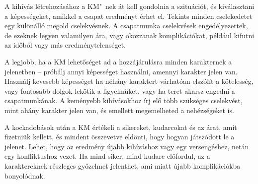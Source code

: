 A kihívás létrehozásához a KM"~nek át kell gondolnia a szituációt, és kiválasztani a képességeket, amikkel a csapat eredményt érhet el. Tekints minden cselekedetet egy különálló megold cselekvésnek. A csapatmunka cselekvések engedélyezettek, de ezeknek legyen valamilyen ára, vagy okozzanak komplikációkat, például kifutni az időből vagy más eredménytelenséget.

A legjobb, ha a KM lehetőséget ad a hozzájárulásra minden karakternek a jelenetben -- próbálj annyi képességet használni, amennyi karakter jelen van. Használj kevesebb képességet ha néhány karaktert várhatóan elszólít a kötelesség, vagy fontosabb dolgok lekötik a figyelmüket, vagy ha teret akarsz engedni a csapatmunkának. A keményebb kihívásokhoz írj elő több szükséges cselekvést, mint ahány karakter jelen van, és emellett megemelheted a nehézségeket is.

A kockadobások után a KM értékeli a sikereket, kudarcokat és az árat, amit fizetniük kellett, és mindent összevetve eldönti, hogy hogyan játszódott le a jelenet. Lehet, hogy az eredmény újabb kihíváshoz vagy egy versengéshez, netán egy konfliktushoz vezet. Ha mind siker, mind kudarc előfordul, az a karaktereknek részleges győzelmet jelenthet, ami miatt újabb komplikációkba bonyolódnak.
